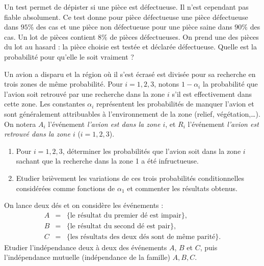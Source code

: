 \documentclass[a4paper,12pt,reqno]{amsart}
\begin{document}
\begin{exo}

  Un test permet de dépister si une pièce est défectueuse. Il n'est cependant pas fiable absolument. Ce test donne pour pièce défectueuse une pièce défectueuse dans $95\%$ des cas et une pièce non défectueuse pour une pièce saine dans $90\%$ des cas. Un lot de pièces contient $8\%$ de pièces défectueuses. On prend une des pièces du lot au hasard : la pièce choisie est testée et déclarée défectueuse. Quelle est la probabilité pour qu'elle le soit vraiment ?

\end{exo}

\begin{exo}

  Un avion a disparu et la région  où il s'est écrasé est divisée pour sa
  recherche en trois zones de même probabilité. Pour $i=1,2,3$, notons
  $1-\alpha_i$ la probabilité que l'avion soit retrouvé par une recherche
  dans la zone $i$ s'il est effectivement dans cette zone. Les constantes
  $\alpha_i$ représentent les probabilités de manquer l'avion et sont
  généralement attribuables à l'environnement de la zone (relief,
  végétation,\dots). On notera $A_i$ l'événement \emph{l'avion est dans la
  zone $i$}, et $R_i$ l'événement \emph{l'avion est retrouvé dans la zone
  $i$} ($i=1,2,3$).

  \begin{enumerate}
    \item  Pour $i=1,2,3$, déterminer les probabilités que l'avion soit dans la zone $i$ sachant que la recherche dans la zone 1 a été infructueuse.
    \item  Etudier brièvement les variations de ces trois probabilités conditionnelles considérées comme fonctions de $\alpha_1$ et commenter les résultats obtenus.
  \end{enumerate}

\end{exo}

\begin{exo}

  On lance deux dés et on considère les événements :
  \begin{eqnarray*}
    A & = & \{\text{le résultat du premier dé est impair}\},\\
    B & = & \{\text{le résultat du second dé est pair}\},\\
    C & = & \{\text{les résultats des deux dés sont de même parité}\}.
  \end{eqnarray*}
  Etudier l'indépendance deux à deux des événements $A$, $B$ et $C$,
  puis l'indépendance mutuelle (indépendance de la famille) $A,B,C$.

\end{exo}
\end{document}
